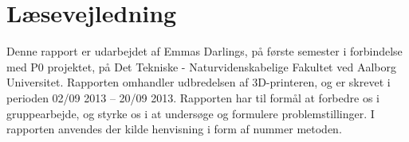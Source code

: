 \chapter{Læsevejledning} %
\label{cha:forord}
Denne rapport er udarbejdet af %
Emmas Darlings, på første semester i forbindelse med P0 projektet, på Det Tekniske - Naturvidenskabelige Fakultet ved Aalborg Universitet. Rapporten omhandler udbredelsen af 3D-printeren, og er skrevet i perioden 02/09 2013 – 20/09 2013.
Rapporten har til formål at forbedre os i gruppearbejde, og styrke os i at undersøge og formulere problemstillinger. 
I rapporten anvendes der kilde henvisning i form af nummer metoden.